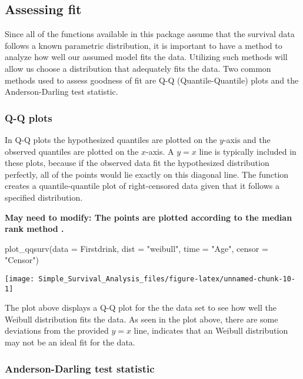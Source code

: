 \hypertarget{assessing-fit}{%
\subsection{Assessing fit}\label{assessing-fit}}

Since all of the functions available in this package assume that the
survival data follows a known parametric distribution, it is important
to have a method to analyze how well our assumed model fits the data.
Utilizing such methods will allow us choose a distribution that
adequately fits the data. Two common methods used to assess goodness of
fit are Q-Q (Quantile-Quantile) plots and the Anderson-Darling test
statistic.

\hypertarget{q-q-plots-1}{%
\subsubsection{Q-Q plots}\label{q-q-plots-1}}

In Q-Q plots the hypothesized quantiles are plotted on the \(y\)-axis
and the observed quantiles are plotted on the \(x\)-axis. A \(y=x\) line
is typically included in these plots, because if the observed data fit
the hypothesized distribution perfectly, all of the points would lie
exactly on this diagonal line. The  function creates
a quantile-quantile plot of right-censored data given that it follows a
specified distribution.

\textbf{May need to modify: The points are plotted according to the
median rank method \citep{Minitabqq}.}

\begin{Schunk}
\begin{Sinput}
plot_qqsurv(data = Firstdrink, dist = "weibull", time = "Age", censor = "Censor")
\end{Sinput}

\texttt{[image: Simple\_Survival\_Analysis\_files/figure-latex/unnamed-chunk-10-1]} \end{Schunk}

The plot above displays a Q-Q plot for the the  data
set to see how well the Weibull distribution fits the data. As seen in
the plot above, there are some deviations from the provided \(y=x\)
line, indicates that an Weibull distribution may not be an ideal fit for
the data.

\hypertarget{anderson-darling-test-statistic}{%
\subsubsection{Anderson-Darling test
statistic}\label{anderson-darling-test-statistic}}

